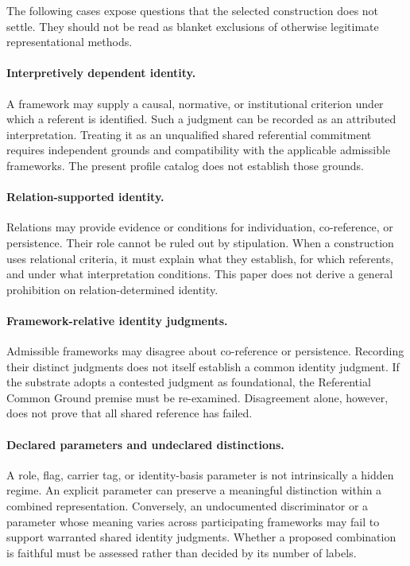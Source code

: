 The following cases expose questions that the selected construction
does not settle.
They should not be read as blanket exclusions of
otherwise legitimate representational methods.

\paragraph{Interpretively dependent identity.}
A framework may supply a causal, normative, or institutional criterion
under which a referent is identified.
Such a judgment can be recorded
as an attributed interpretation.
Treating it as an unqualified shared
referential commitment requires independent grounds and compatibility
with the applicable admissible frameworks.
The present profile catalog
does not establish those grounds.

\paragraph{Relation-supported identity.}
Relations may provide evidence or conditions for individuation,
co-reference, or persistence.
Their role cannot be ruled out by
stipulation.
When a construction uses relational criteria, it must
explain what they establish, for which referents, and under what
interpretation conditions.
This paper does not derive a general
prohibition on relation-determined identity.

\paragraph{Framework-relative identity judgments.}
Admissible frameworks may disagree about co-reference or persistence.
Recording their distinct judgments does not itself establish a common
identity judgment.
If the substrate adopts a contested judgment as
foundational, the Referential Common Ground premise must be
re-examined.
Disagreement alone, however, does not prove that all
shared reference has failed.

\paragraph{Declared parameters and undeclared distinctions.}
A role, flag, carrier tag, or identity-basis parameter is not
intrinsically a hidden regime.
An explicit parameter can preserve a
meaningful distinction within a combined representation.
Conversely, an undocumented discriminator or a parameter whose meaning
varies across participating frameworks may fail to support warranted
shared identity judgments.
Whether a proposed combination is faithful
must be assessed rather than decided by its number of labels.

